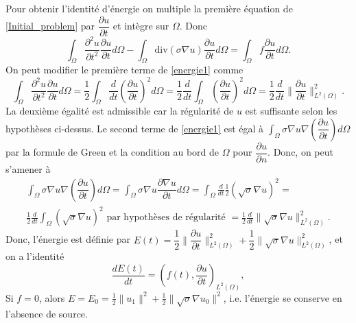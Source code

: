 \documentclass[12pt]{article}
\newcommand{\pd}[2]{ %
	\dfrac{\partial #1}{\partial #2}
}
\begin{document}
Pour obtenir l'identité d'énergie on multiple la première équation de   \eqref{Initial_problem} par $\pd{u}{t}$ et intègre sur $\Omega$. Donc
\begin{equation}
\label{energie1}
	\int_\Omega{\dfrac{\partial^2u}{\partial t^2} \pd{u}{t} d\Omega} - \int_\Omega{\text{div}(\sigma \nabla u)\pd{u}{t} d\Omega} = \int_\Omega{f \pd{u}{t} d\Omega}.
\end{equation}
On peut modifier le première terme de \eqref{energie1} comme
\begin{equation*}
	\int_\Omega{\dfrac{\partial^2u}{\partial t^2} \pd{u}{t} d\Omega}= \frac{1}{2}\int_\Omega{\frac{d}{dt}(\pd{u}{t})^2d\Omega} = \frac{1}{2}\frac{d}{dt}\int_\Omega{(\pd{u}{t})^2d\Omega} = \frac{1}{2}\frac{d}{dt}\|\pd{u}{t}\|^2_{L^2(\Omega)}.
\end{equation*}
La deuxième égalité est admissible car la régularité de $u$ est suffisante selon les hypothèses ci-dessus.
Le second terme de \eqref{energie1} est égal à $\int_\Omega{\sigma \nabla u \nabla(\pd{u}{t}) d\Omega}$ par la formule de Green et la condition au bord de $\Omega$ pour $\pd{u}{n}$. Donc, on peut s'amener à
\begin{multline*}
	\int_\Omega{\sigma \nabla u \nabla(\pd{u}{t}) d\Omega} = \int_\Omega{\sigma \nabla u\pd{\nabla u}{t} d\Omega} = \int_{\Omega}{\frac{d}{dt}\frac{1}{2}(\sqrt{\sigma}\nabla u)^2} =\\ \frac{1}{2}\frac{d}{dt}\int_{\Omega}{(\sqrt{\sigma}\nabla u)^2} \text{ par hypothèses de régularité }
	= \frac{1}{2}\frac{d}{dt}\|\sqrt{\sigma}\nabla u\|^2_{L^2(\Omega)}.
\end{multline*}
Donc, l'énergie est définie par $E(t) = \dfrac{1}{2}\|\pd{u}{t}\|^2_{L^2(\Omega)} + \dfrac{1}{2}\|\sqrt{\sigma}\nabla u\|^2_{L^2(\Omega)}$, et on a l'identité
\begin{equation*}
\dfrac{d E(t)}{dt} = (f(t),\pd{u}{t})_{L^2(\Omega)},
\end{equation*}
Si $f = 0$, alors $E = E_0 = \frac{1}{2}\|u_1\|^2 + \frac{1}{2}\|\sqrt{\sigma}\nabla u_0\|^2$, i.e. l'énergie se conserve en l'absence de source.
\end{document}
